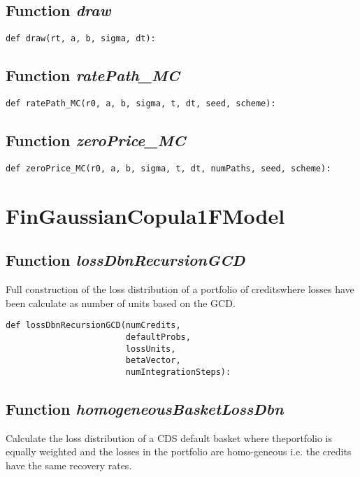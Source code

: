 \documentclass[twoside,11pt]{book}
\begin{document}
\subsection{Function {\it draw}}


\begin{lstlisting}
def draw(rt, a, b, sigma, dt):
\end{lstlisting}

\subsection{Function {\it ratePath\_MC}}


\begin{lstlisting}
def ratePath_MC(r0, a, b, sigma, t, dt, seed, scheme):
\end{lstlisting}

\subsection{Function {\it zeroPrice\_MC}}


\begin{lstlisting}
def zeroPrice_MC(r0, a, b, sigma, t, dt, numPaths, seed, scheme):
\end{lstlisting}

\newpage
\section{FinGaussianCopula1FModel}

\subsection{Function {\it lossDbnRecursionGCD}}
Full construction of the loss distribution of a portfolio of creditswhere losses have been calculate as number of units based on the GCD. 

\begin{lstlisting}
def lossDbnRecursionGCD(numCredits,
                        defaultProbs,
                        lossUnits,
                        betaVector,
                        numIntegrationSteps):
\end{lstlisting}

\subsection{Function {\it homogeneousBasketLossDbn}}
Calculate the loss distribution of a CDS default basket where theportfolio is equally weighted and the losses in the portfolio are homo-geneous i.e. the credits have the same recovery rates. 
\end{document}

